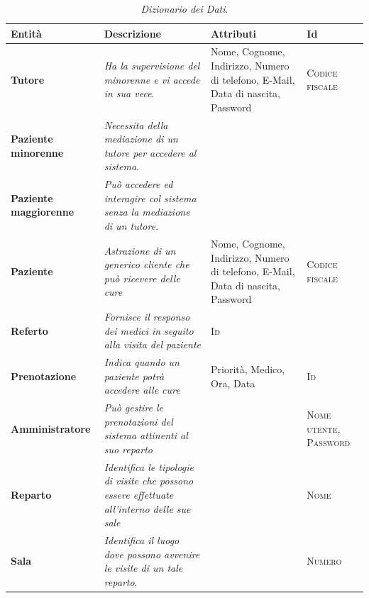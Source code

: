 \begin{table}[p]

\begin{tabularx}{\columnwidth}{XXXX}
\toprule
Entità & Descrizione & Attributi & Id\\
\midrule
\textbf{Tutore} & \textit{Ha la supervisione del minorenne e vi accede in sua vece}.
	& Nome, Cognome, Indirizzo, Numero di telefono, E-Mail, Data di nascita,
	Password & \textsc{Codice fiscale}\\
\textbf{Paziente minorenne} & \textit{Necessita della mediazione di un tutore per accedere
	al sistema}. &  & \\
\textbf{Paziente maggiorenne} & \textit{Può accedere ed interagire col sistema senza la 
	mediazione di un tutore}. &  & \\
\textbf{Paziente} & \textit{Astrazione di un generico cliente che può ricevere delle cure} & 
	Nome, Cognome, Indirizzo, Numero di telefono, E-Mail, 
	Data di nascita, Password & \textsc{Codice fiscale}\\ 
\textbf{Referto} & \textit{Fornisce il responso dei medici in seguito alla visita del
	paziente} & \textsc{Id} &\\
\textbf{Prenotazione} & \textit{Indica quando un paziente potrà accedere alle cure} & 
	Priorità, Medico, Ora, Data & \textsc{Id}\\
\textbf{Amministratore} & \textit{Può gestire le prenotazioni del sistema attinenti al
	suo reparto} & & \textsc{Nome utente, Password}\\
\textbf{Reparto} & \textit{Identifica le tipologie di visite che possono essere 
	effettuate all'interno delle sue sale} & & \textsc{Nome}\\
\textbf{Sala} & \textit{Identifica il luogo dove possono avvenire le visite di un tale
	reparto}. & & \textsc{Numero}\\
\end{tabularx}
\bigskip


\caption{\textit{Dizionario dei Dati}.}\label{tab:ddd}
\end {table}

